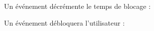 \documentclass{article}
\begin{document}
\begin{enumerate}
\begin{enumerate}
\begin{enumerate}
        \vspace{0.4cm}
        \hspace*{-1.05in}
               \noindent{}
        
        
        
        \newpage
        
         Un événement décrémente le temps de blocage :
        
        \vspace{0.4cm}
        \hspace*{-1.05in}
               \noindent{}
        
        Un événement débloquera l'utilisateur :
        

\end{enumerate}
\end{enumerate}
\end{enumerate}
\end{document}
